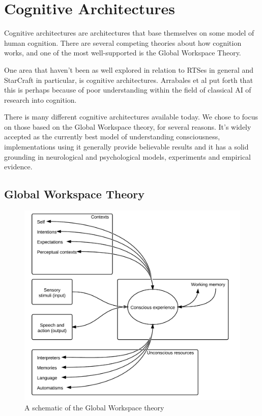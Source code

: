 \section{Cognitive Architectures}
\label{sec:cogarch}
Cognitive architectures are architectures that base themselves on some model of human cognition. There are several competing theories about how cognition works, and one of the most well-supported is the Global Workspace Theory.

One area that haven't been as well explored in relation to RTSes in general and StarCraft in particular, is cognitive architectures. Arrabales et al put forth that this is perhaps because of poor understanding within the field of classical AI of research into cognition. \cite{arrabales2009gamechars}

There is many different cognitive architectures available today\cite{duch2008cognitive}. We chose to focus on those based on the Global Workspace theory, for several reasons. It's widely accepted as the currently best model of understanding consciousness\cite{Franklin2012}, implementations using it generally provide believable results\cite{arrabales2009gamechars}\cite{snaider2011lida} and it has a solid grounding in neurological and psychological models, experiments and empirical evidence\cite{Franklin2012}.

\subsection{Global Workspace Theory}

\begin{figure}[h!tb]
\centering
\includegraphics[scale=1.0]{graphics/globalworkspace.png}
\caption{A schematic of the Global Workspace theory\cite{baars2005gwt}}
\label{fig:gwt}
\end{figure}

